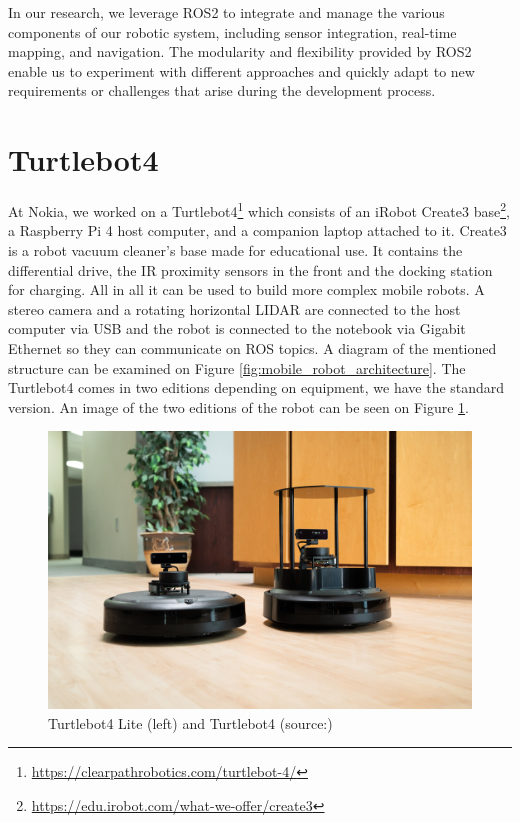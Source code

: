 In our research, we leverage ROS2 to integrate and manage the various components of our robotic system, including sensor integration, real-time mapping, and navigation. The modularity and flexibility provided by ROS2 enable us to experiment with different approaches and quickly adapt to new requirements or challenges that arise during the development process.

\section{Turtlebot4}
At Nokia, we worked on a Turtlebot4\footnote{\url{https://clearpathrobotics.com/turtlebot-4/}} which consists of an iRobot Create3 base\footnote{\url{https://edu.irobot.com/what-we-offer/create3}}, a Raspberry Pi 4 host computer, and a companion laptop attached to it. Create3 is a robot vacuum cleaner's base made for educational use. It contains the differential drive, the IR proximity sensors in the front and the docking station for charging. All in all it can be used to build more complex mobile robots.
A stereo camera and a rotating horizontal LIDAR are connected to the host computer via USB and the robot is connected to the notebook via Gigabit Ethernet so they can communicate on ROS topics. A diagram of the mentioned structure can be examined on Figure \ref{fig:mobile_robot_architecture}. The Turtlebot4 comes in two editions depending on equipment, we have the standard version. An image of the two editions of the robot can be seen on Figure \ref{fig:turtlebot4}.

\begin{figure}[htbp]
    \centering
    \includegraphics[width=150mm, keepaspectratio]{figures/TurtleBot4.jpg}
    \caption{Turtlebot4 Lite (left) and Turtlebot4 (source:\cite{Turtlebot4Pic})}
    \label{fig:turtlebot4}
\end{figure}

